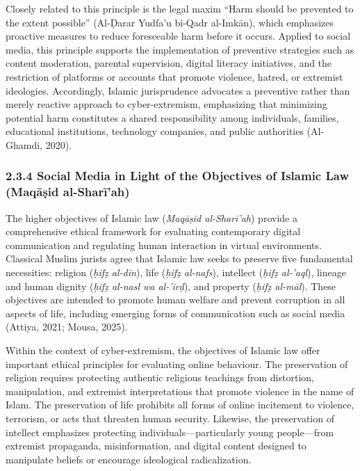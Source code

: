 \documentclass[10pt]{NSP1}
\begin{document}
	Closely related to this principle is the legal maxim ``Harm should be prevented to the extent possible'' (Al-\d{D}arar Yudfa'u bi-Qadr al-Imk\={a}n), which emphasizes proactive measures to reduce foreseeable harm before it occurs. Applied to social media, this principle supports the implementation of preventive strategies such as content moderation, parental supervision, digital literacy initiatives, and the restriction of platforms or accounts that promote violence, hatred, or extremist ideologies. Accordingly, Islamic jurisprudence advocates a preventive rather than merely reactive approach to cyber-extremism, emphasizing that minimizing potential harm constitutes a shared responsibility among individuals, families, educational institutions, technology companies, and public authorities (Al-Ghamdi, 2020).
	
	\subsubsection*{2.3.4 Social Media in Light of the Objectives of Islamic Law (Maq\={a}\d{s}id al-Shar\={i}'ah)}
	
	The higher objectives of Islamic law (\textit{Maq\={a}\d{s}id al-Shar\={i}'ah}) provide a comprehensive ethical framework for evaluating contemporary digital communication and regulating human interaction in virtual environments. Classical Muslim jurists agree that Islamic law seeks to preserve five fundamental necessities: religion (\textit{\d{h}if\d{z} al-d\={i}n}), life (\textit{\d{h}if\d{z} al-nafs}), intellect (\textit{\d{h}if\d{z} al-'aql}), lineage and human dignity (\textit{\d{h}if\d{z} al-nasl wa al-'ir\d{d}}), and property (\textit{\d{h}if\d{z} al-m\={a}l}). These objectives are intended to promote human welfare and prevent corruption in all aspects of life, including emerging forms of communication such as social media (Attiya, 2021; Mousa, 2025).
	
	Within the context of cyber-extremism, the objectives of Islamic law offer important ethical principles for evaluating online behaviour. The preservation of religion requires protecting authentic religious teachings from distortion, manipulation, and extremist interpretations that promote violence in the name of Islam. The preservation of life prohibits all forms of online incitement to violence, terrorism, or acts that threaten human security. Likewise, the preservation of intellect emphasizes protecting individuals—particularly young people—from extremist propaganda, misinformation, and digital content designed to manipulate beliefs or encourage ideological radicalization.
	
\end{document}
